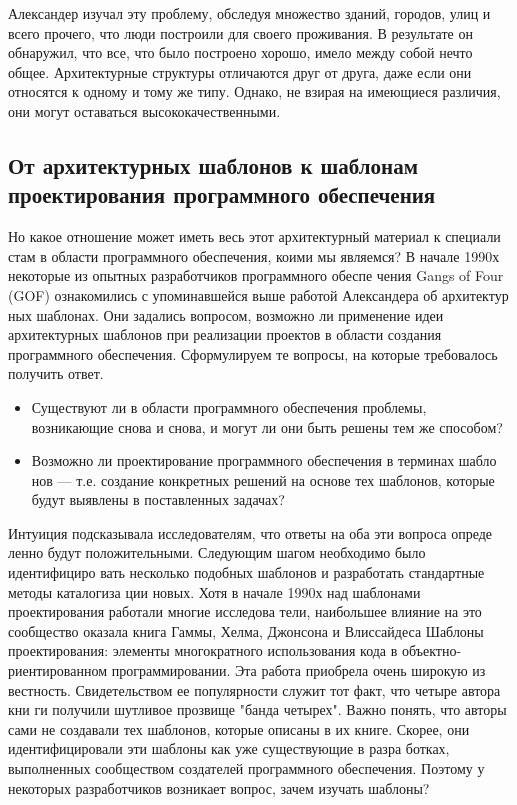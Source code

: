 \documentclass[10pt]{article}
\begin{document}
Александер изучал эту проблему, обследуя множество зданий, городов, улиц и всего прочего,
что люди построили для своего проживания. В результате он обнаружил,
что все, что было построено хорошо, имело между собой нечто общее.
Архитектурные структуры отличаются друг от друга, даже если они относятся к
одному и тому же типу. Однако, не взирая на имеющиеся различия, они могут оставаться
высококачественными.

\subsection{От архитектурных шаблонов к шаблонам проектирования программного обеспечения}
Но какое отношение может иметь весь этот архитектурный материал к специали
стам в области программного обеспечения, коими мы являемся?
В начале 1990х некоторые из опытных разработчиков программного обеспе
чения Gangs of Four (GOF) ознакомились с упоминавшейся выше работой Александера об архитектур
ных шаблонах.
Они задались вопросом, возможно ли применение идеи архитектурных шаблонов
при реализации проектов в области создания программного обеспечения.
Сформулируем те вопросы, на которые требовалось получить ответ.
\begin{itemize}
	\item Существуют ли в области программного обеспечения проблемы, возникающие
снова и снова, и могут ли они быть решены тем же способом?
	\item Возможно ли проектирование программного обеспечения в терминах шабло
нов — т.е. создание конкретных решений на основе тех шаблонов, которые
будут выявлены в поставленных задачах?
\end{itemize}
Интуиция подсказывала исследователям, что ответы на оба эти вопроса опреде
ленно будут положительными. Следующим шагом необходимо было идентифициро
вать несколько подобных шаблонов и разработать стандартные методы каталогиза
ции новых.
Хотя в начале 1990х над шаблонами проектирования работали многие исследова
тели, наибольшее влияние на это сообщество оказала книга Гаммы, Хелма, Джонсона
и Влиссайдеса Шаблоны проектирования: элементы многократного использования кода в
объектно-риентированном программировании. Эта работа приобрела очень широкую из
вестность. Свидетельством ее популярности служит тот факт, что четыре автора кни
ги получили шутливое прозвище "банда четырех".
Важно понять, что авторы сами не создавали тех шаблонов, которые описаны в их
книге. Скорее, они идентифицировали эти шаблоны как уже существующие в разра
ботках, выполненных сообществом создателей программного обеспечения. Поэтому у некоторых
разработчиков возникает вопрос, зачем изучать шаблоны?
\end{document}
